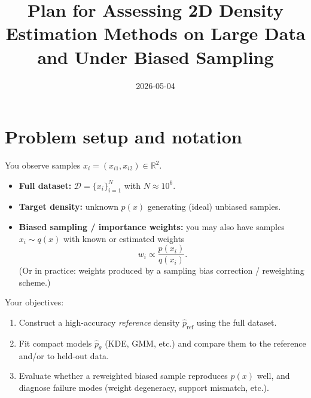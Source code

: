 \documentclass[twocolumn]{notes}
\title{Plan for Assessing 2D Density Estimation Methods on Large Data and Under Biased Sampling}
\date{2026-05-04}
\begin{document}
\maketitle
\tableofcontents
\newpage


\section{Problem setup and notation}

You observe samples $x_i=(x_{i1},x_{i2})\in\mathbb{R}^2$.
\begin{itemize}[leftmargin=2em]
\item \textbf{Full dataset:} $\mathcal{D}=\{x_i\}_{i=1}^N$ with $N\approx 10^6$.
\item \textbf{Target density:} unknown $p(x)$ generating (ideal) unbiased samples.
\item \textbf{Biased sampling / importance weights:} you may also have samples $x_i\sim q(x)$ with known or estimated weights
\[
w_i \propto \frac{p(x_i)}{q(x_i)}.
\]
(Or in practice: weights produced by a sampling bias correction / reweighting scheme.)
\end{itemize}

Your objectives:
\begin{enumerate}[leftmargin=2em]
\item Construct a high-accuracy \emph{reference} density $\hat p_{\mathrm{ref}}$ using the full dataset.
\item Fit compact models $\hat p_\theta$ (KDE, GMM, etc.) and compare them to the reference and/or to held-out data.
\item Evaluate whether a reweighted biased sample reproduces $p(x)$ well, and diagnose failure modes (weight degeneracy, support mismatch, etc.).
\end{enumerate}
\end{document}
